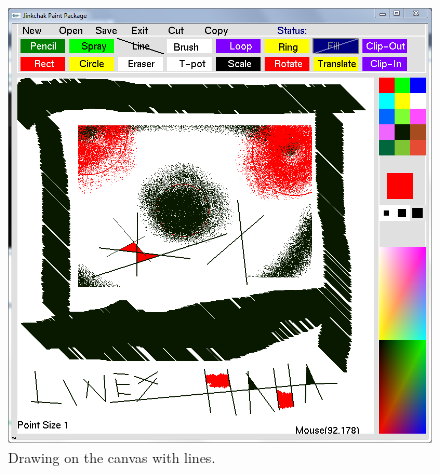 \documentclass[12pt]{report}
\begin{document}
\begin{figure}[h!]  
  \centering
    \includegraphics[scale=0.45]{screenshots/lines.png}
\caption{Drawing on the canvas with lines.}
\end{figure}
\end{document}
